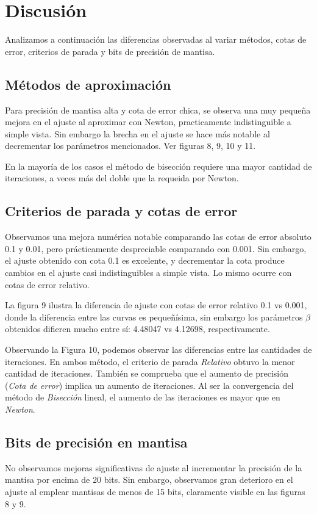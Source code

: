 \documentclass[a4paper,10pt,twoside]{article}
\begin{document}
\section{Discusión}

Analizamos a continuación las diferencias observadas al variar métodos, cotas
de error, criterios de parada y bits de precisión de mantisa.


\subsection{Métodos de aproximación}
Para precisión de mantisa alta y cota de error chica, se observa una muy pequeña
mejora en el ajuste al aproximar con Newton, practicamente indistinguible a simple
vista. Sin embargo la brecha en el ajuste se hace más notable al decrementar
los parámetros mencionados. Ver figuras 8, 9, 10 y 11.

En la mayoría de los casos el método de bisección requiere una mayor cantidad
de iteraciones, a veces más del doble que la requeida por Newton.


\subsection{Criterios de parada y cotas de error}
Observamos una mejora numérica notable comparando las cotas de error absoluto 0.1 y 0.01,
pero prácticamente despreciable comparando con 0.001. Sin embargo, el ajuste
obtenido con cota 0.1 es excelente, y decrementar la cota produce cambios en
el ajuste casi indistinguibles a simple vista. Lo mismo ocurre con cotas de error relativo.

La figura 9 ilustra la diferencia de ajuste con cotas de error relativo 0.1 vs 0.001,
donde la diferencia entre las curvas es pequeñísima, sin embargo los parámetros
$\beta$ obtenidos difieren mucho entre sí: 4.48047 vs 4.12698, respectivamente.

Observando la Figura 10, podemos observar las diferencias entre las cantidades de iteraciones. En ambos método, el criterio de parada \textit{Relativo} obtuvo la menor cantidad de iteraciones. También se comprueba que el aumento de precisión (\textit{Cota de error}) implica un aumento de iteraciones. Al ser la convergencia del método de \textit{Bisección} lineal, el aumento de las iteraciones es mayor que en \textit{Newton}.

\subsection{Bits de precisión en mantisa}
No observamos mejoras significativas de ajuste al incrementar la precisión de
la mantisa por encima de 20 bits. Sin embargo, observamos gran deterioro en el
ajuste al emplear mantisas de menos de 15 bits, claramente visible en las figuras
8 y 9.
\end{document}
